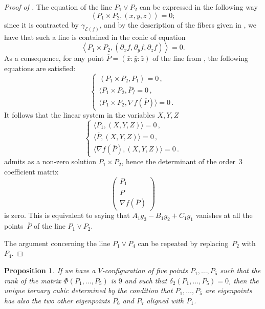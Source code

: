 \documentclass{amsart}
\theoremstyle{plain}
\newtheorem{prop}[lemma]{Proposition}
\theoremstyle{definition}
\newcommand{\de}{\partial}
\newcommand{\Eig}[1]{\mathcal{E}\!\left( {#1} \right)}
\begin{document}
\begin{proof}[Proof of ]
The equation of the line $P_1 \vee P_2$ can be expressed in the following way
%
\begin{equation}
\label{eq:lineP1P2}
  \left\langle P_1 \times P_2, (x,y,z) \right\rangle = 0;
\end{equation}
%
since it is contracted by $\gamma_{\Eig{f}}$, and by the description of the fibers given in , we have that such a line is contained in the conic of equation
%
\[
  \left\langle P_1 \times P_2, (\de_x f, \de_y f, \de_z f) \right\rangle = 0.
\]
%
As a consequence, for any point $\overline{P} = (\bar x: \bar y: \bar z)$ of the line  from , the following equations are satisfied:
%
\[
\left\{
\begin{array}{l}
  \left\langle P_1 \times P_2, P_1 \right\rangle = 0 \,,\\[2pt]
  \bigl\langle P_1 \times P_2, \overline{P} \bigr\rangle = 0 \,,\\[2pt]
  \bigl\langle P_1 \times P_2, \nabla f (\overline{P}) \bigr\rangle = 0 \,.
\end{array}
\right.
\]
%
It follows that the linear system in the variables $X,Y,Z$
%
\[
\left\{
\begin{array}{l}
  \bigl\langle  P_1, (X,Y,Z) \bigr\rangle = 0 \,,\\[2pt]
  \bigl\langle \overline{P}, (X,Y,Z) \bigr\rangle = 0 \,,\\[2pt]
  \bigl\langle \nabla f (\overline{P}),
  (X,Y,Z) \bigr\rangle = 0 \,.
\end{array}
\right.
\]
%
admits as a non-zero solution $P_1 \times P_2$,
hence the determinant of the order~$3$ coefficient matrix
%
\[
 \left(
 \begin{array}{c}
  P_1 \\
  \overline{P} \\
  \nabla f (\overline{P})
 \end{array}
 \right)
\]
%
is zero. This is equivalent to saying that $A_1 g_3 - B_1 g_2 +C_1 g_1$ vanishes at all the points~$\overline{P}$ of the line $P_1 \vee P_2$.

The argument concerning the line $P_1 \vee P_4$  can be repeated by replacing~$P_2$ with~$P_4$.
\end{proof}
%
\begin{prop}
\label{proposition:third_alignment}
If we have a $V$-configuration of five points $P_1, \dots, P_5$
such that the rank of the matrix $\Phi(P_1, \dots, P_5)$ is $9$ and
such that $\delta_2(P_1, \dots, P_5) = 0$,
then the unique ternary cubic determined by the condition that $P_1, \dots, P_5$
are eigenpoints has also the two other eigenpoints $P_6$ and $P_7$
aligned with $P_1$.
\end{prop}
\end{document}
